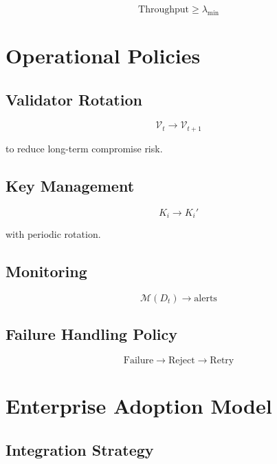 \begin{equation}
\text{Throughput} \geq \lambda_{\min}
\end{equation}

\section{Operational Policies}

\subsection{Validator Rotation}

\begin{equation}
\mathcal{V}_t \rightarrow \mathcal{V}_{t+1}
\end{equation}

to reduce long-term compromise risk.

\subsection{Key Management}

\begin{equation}
K_i \rightarrow K_i'
\end{equation}

with periodic rotation.

\subsection{Monitoring}

\begin{equation}
\mathcal{M}(D_t) \rightarrow \text{alerts}
\end{equation}

\subsection{Failure Handling Policy}

\begin{equation}
\text{Failure} \rightarrow \text{Reject} \rightarrow \text{Retry}
\end{equation}

\section{Enterprise Adoption Model}

\subsection{Integration Strategy}

